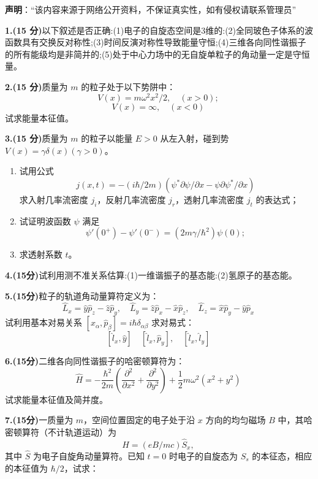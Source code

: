 
\textbf{声明}：“该内容来源于网络公开资料，不保证真实性，如有侵权请联系管理员”

\textbf{1.(15 分)}以下叙述是否正确:(1)电子的自旋态空间是3维的:(2)全同玻色子体系的波函数具有交换反对称性;(3)时间反演对称性导致能量守恒;(4)三维各向同性谐振子的所有能级均是非简并的;(5)处于中心力场中的无自旋单粒子的角动量一定是守恒量。

\textbf{2.(15 分)}质量为 $m$ 的粒子处于以下势阱中：
\[
V(x) = m \omega^2 x^2/2, \quad (x > 0);~
\]
\[
V(x) = \infty, \quad (x < 0)~
\]
试求能量本征值。

\textbf{3.(15 分)}质量为 $m$ 的粒子以能量 $E > 0$ 从左入射，碰到势 $V(x) = \gamma \delta(x) (\gamma > 0)$。

\begin{enumerate}
    \item 试用公式
    \[
    j(x,t) = -(i\hbar/2m)(\psi^* \partial \psi/\partial x - \psi \partial \psi^*/\partial x)~
    \]
    求入射几率流密度 $j_i$，反射几率流密度 $j_r$，透射几率流密度 $j_t$ 的表达式；
    
    \item 试证明波函数 $\psi$ 满足
    \[
    \psi'(0^+) - \psi'(0^-) = (2m\gamma/\hbar^2)\psi(0);~
    \]
    
    \item 求透射系数 $t$。
\end{enumerate}

\textbf{4.(15分)}试利用测不准关系估算:(1)一维谐振子的基态能:(2)氢原子的基态能。


\textbf{5.(15分)}粒子的轨道角动量算符定义为：
\[
\hat{L}_x = \hat{y}\hat{p}_z - \hat{z}\hat{p}_y, \quad \hat{L}_y = \hat{z}\hat{p}_x - \hat{x}\hat{p}_z, \quad \hat{L}_z = \hat{x}\hat{p}_y - \hat{y}\hat{p}_x~
\]
试利用基本对易关系 $[\hat{x}_\alpha, \hat{p}_\beta] = i\hbar \delta_{\alpha\beta}$ 求对易式：
\[
[\hat{l}_x, \hat{y}] \quad [\hat{l}_x, \hat{p}_y],\quad[\hat{l}_x, \hat{l}_y]~
\]

\textbf{6.(15分)}二维各向同性谐振子的哈密顿算符为：
\[
\hat{H} = -\frac{\hbar^2}{2m} \left( \frac{\partial^2}{\partial x^2} + \frac{\partial^2}{\partial y^2} \right) + \frac{1}{2} m \omega^2 (x^2 + y^2)~
\]
试求能量本征值及简并度。

\textbf{7.(15分)}一质量为 $m$，空间位置固定的电子处于沿 $x$ 方向的均匀磁场 $B$ 中，其哈密顿算符（不计轨道运动）为
\[
\hat{H} =(eB/mc)\hat{S}_x,~
\]
其中 $\hat{S}$ 为电子自旋角动量算符。已知 $t=0$ 时电子的自旋态为 $S_s$ 的本征态，相应的本征值为 $\hbar / 2$，试求：


